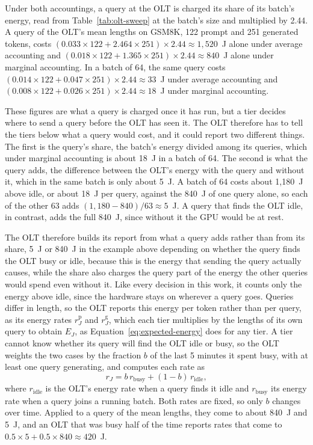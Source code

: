 \documentclass[cic,dipl,english]{infufrgs}
\begin{document}
Under both accountings, a query at the OLT is charged its share of its batch's energy, read
from Table~\ref{tab:olt-sweep} at the batch's size and multiplied by 2.44.
A query of the OLT's mean lengths on GSM8K, 122 prompt and 251 generated tokens, costs
$(0.033 \times 122 + 2.464 \times 251) \times 2.44 \approx 1{,}520$~J alone under average
accounting and $(0.018 \times 122 + 1.365 \times 251) \times 2.44 \approx 840$~J alone under
marginal accounting. In a batch of 64, the same query costs
$(0.014 \times 122 + 0.047 \times 251) \times 2.44 \approx 33$~J under average accounting and
$(0.008 \times 122 + 0.026 \times 251) \times 2.44 \approx 18$~J under marginal accounting.

These figures are what a query is charged once it has run, but a tier decides where to send a
query before the OLT has seen it. The OLT therefore has to tell the tiers below what a query
would cost, and it could report two different things. The first is
the query's share, the batch's energy divided among its queries, which under marginal
accounting is about 18~J in a batch of 64. The second is what the query adds, the difference
between the OLT's energy with the query and without it, which in the same batch is only about
5~J. A batch of 64 costs about 1,180~J above idle, or about 18~J per query, against the 840~J
of one query alone, so each of the other 63 adds $(1{,}180 - 840)/63 \approx 5$~J. A query that
finds the OLT idle, in contrast, adds the full 840~J, since without it the GPU would be at rest.

The OLT therefore builds its report from what a query adds rather than from its share, 5~J or
840~J in the example above depending on whether the query finds the OLT busy or idle, because
this is the energy that sending the query actually causes, while the share also charges the query part of the energy the other queries
would spend even without it. Like every decision in this work, it counts only the energy
above idle, since the hardware stays on wherever a query goes. Queries differ in length, so
the OLT reports this energy per token rather than per query, as its energy rates
$r^{\text{p}}_J$ and $r^{\text{g}}_J$, which each tier multiplies by the lengths of its own
query to obtain $E_J$, as Equation~\eqref{eq:expected-energy} does for any tier. A tier cannot know whether its
query will find the OLT idle or busy, so the OLT weights the two cases by the fraction $b$ of
the last 5 minutes it spent busy, with at least one query generating, and computes each rate as
\begin{equation}
  r_J = b \, r_{\text{busy}} + (1-b) \, r_{\text{idle}},
  \label{eq:olt-report}
\end{equation}
where $r_{\text{idle}}$ is the OLT's energy rate when a query finds it idle and
$r_{\text{busy}}$ its energy rate when a query joins a running batch. Both rates are fixed, so only $b$ changes over
time. Applied to a query of the mean lengths, they come to about 840~J and 5~J, and an OLT that
was busy half of the time reports rates that come to $0.5 \times 5 + 0.5 \times 840 \approx
420$~J.
\end{document}
